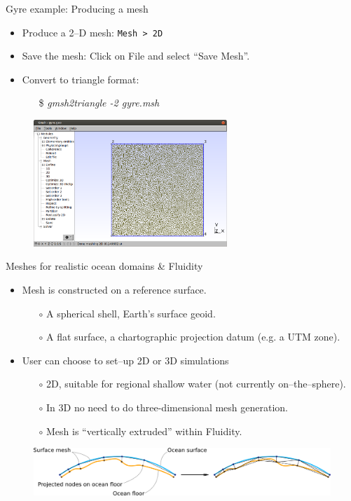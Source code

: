 \documentclass[t]{beamer}
\begin{document}
\begin{frame}{Gyre example: Producing a mesh}
   \begin{itemize}
      \item Produce a 2--D mesh: \lstinline{Mesh > 2D}
      \item Save the mesh: Click on File and select ``Save Mesh''.
      \item Convert to triangle format:
      \begin{itemize}
          \item[\$]\emph{gmsh2triangle -2 gyre.msh}
      \end{itemize}
   \end{itemize}
\begin{figure}[htbp]
 \centering
  \includegraphics[width=0.65\textwidth]{../figures/2d-example-Gmsh-mesh}
  \label{fig:shot16}
\end{figure}
\end{frame}

\begin{frame}{Meshes for realistic ocean domains \& Fluidity}
\begin{itemize}
    \item Mesh is constructed on a reference surface.
    \begin{itemize}
        \item[$\circ$] A spherical shell, Earth's surface geoid.
        \item[$\circ$] A flat surface, a chartographic projection datum (e.g. a UTM zone).
    \end{itemize}
    \item User can choose to set--up 2D or 3D simulations
    \begin{itemize}
        \item[$\circ$] 2D, suitable for regional shallow water (not currently on--the--sphere).
        \item[$\circ$] In 3D no need  to do three-dimensional mesh generation.
        \item[$\circ$] Mesh is ``vertically extruded'' within Fluidity.
    \end{itemize}
\end{itemize}
\begin{figure}[htbp!]
 \centering
  \includegraphics[width=1.0\textwidth]{../figures/mesh_extrusion.png}
\end{figure}
\end{frame}
\end{document}
